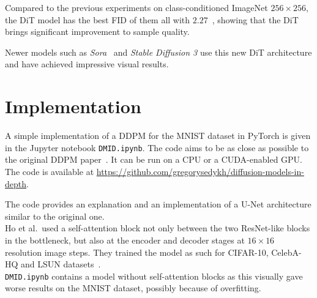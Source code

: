 \documentclass{article}
\numberwithin{equation}{section}
\numberwithin{figure}{section}
\begin{document}
Compared to the previous experiments on class-conditioned ImageNet $256 \times 256$, the DiT model has the best FID of them all with $2.27$~\cite{peebles2023scalable}, showing that the DiT brings significant improvement to sample quality.

Newer models such as \textit{Sora}~\cite{videoworldsimulators2024} and \textit{Stable Diffusion 3} use this new DiT architecture and have achieved impressive visual results.

\newpage
\section{Implementation}
A simple implementation of a DDPM for the MNIST dataset in PyTorch is given in the Jupyter notebook \texttt{DMID.ipynb}. The code aims to be as close as possible to the original DDPM paper~\cite{ho2020denoising}. It can be run on a CPU or a CUDA-enabled GPU. The code is available at \url{https://github.com/gregorysedykh/diffusion-models-in-depth}.

The code provides an explanation and an implementation of a U-Net architecture similar to the original one. \\
Ho et al.\ used a self-attention block not only between the two ResNet-like blocks in the bottleneck, but also at the encoder and decoder stages at $16 \times 16$ resolution image steps. They trained the model as such for CIFAR-10, CelebA-HQ and LSUN datasets~\cite{ho2020denoising}. \\
\texttt{DMID.ipynb} contains a model without self-attention blocks as this visually gave worse results on the MNIST dataset, possibly because of overfitting.
\end{document}
